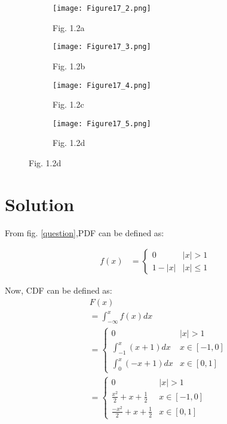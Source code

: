 \documentclass[journal,12pt,twocolumn]{IEEEtran}
\begin{document}
\begin{figure}
\captionsetup[subfigure]{labelformat=empty}
     \centering
     \begin{subfigure}[b]{0.5\columnwidth}
         \centering
         \texttt{[image: Figure17\_2.png]}
         \caption{Fig. 1.2a}
         \label{option1}
     \end{subfigure}
     \quad
     \begin{subfigure}[b]{0.5\columnwidth}
         \centering
         \texttt{[image: Figure17\_3.png]}
         \caption{Fig. 1.2b}
         \label{option2}
     \end{subfigure}
     \quad
     \begin{subfigure}[b]{0.5\columnwidth}
         \centering
         \texttt{[image: Figure17\_4.png]}
         \caption{Fig. 1.2c}
         \label{option3}
     \end{subfigure}
     \quad
     \begin{subfigure}[b]{0.5\columnwidth}
         \centering
         \texttt{[image: Figure17\_5.png]}
         \caption{Fig. 1.2d}
         \label{option4}
     \end{subfigure}
\end{figure}

\newpage
\section{Solution}

From fig. \ref{question},PDF can be defined as:

\begin{align}
f(x) &= 
\begin{cases}  
0 & |x|>1 \\
1-|x| & |x| \leq 1
\end{cases}
\end{align}

Now, CDF can be defined as:
\begin{align}
    &F(x)  \\ &=\int_{-\infty}^{x}f(x)dx  \\
    &=
    \begin{cases} 
    0 & |x|>1 \\
    \int_{-1}^{x}(x+1)dx & x \in [-1,0] \\
    \int_{0}^{x}(-x+1)dx & x \in [0,1]
    \end{cases}
    \\
    &=
    \begin{cases}  \label{eq1}
    0 & |x|>1 \\
    \frac{x^2}{2}+x+\frac{1}{2} & x \in [-1,0] \\
    \frac{-x^2}{2}+x+\frac{1}{2} & x \in [0,1]
    \end{cases}
\end{align}
\end{document}
